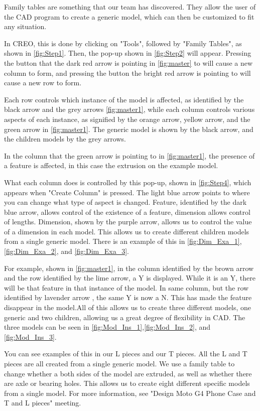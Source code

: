 \par Family tables are something that our team has discovered. They allow the user of the CAD program to create a generic model, which can then be customized to fit any situation. 
\par In CREO, this is done by clicking on "Tools", followed by "Family Tables", as shown in \ref{fig:Step1}. Then, the pop-up shown in \ref{fig:Step2} will appear. Pressing the button that the dark red arrow is pointing in \ref{fig:master} to will cause a new column to form, and pressing the button the bright red arrow is pointing to will cause a new row to form. 
\par Each row controls which instance of the model is affected, as identified by the black arrow and the grey arrows \ref{fig:master1}, while each column controls various aspects of each instance, as signified by the orange arrow, yellow arrow, and the green arrow in \ref{fig:master1}. The generic model is shown by the black arrow, and the children models by the grey arrows. 
\par In the column that the green arrow is pointing to in \ref{fig:master1}, the presence of a feature is affected, in this case the extrusion on the example model. 
\par What each column does is controlled by this pop-up, shown in \ref{fig:Step4}, which appears when "Create Column" is pressed. The light blue arrow points to where you can change what type of aspect is changed. Feature, identified by the dark blue arrow, allows control of the existence of a feature, dimension allows control of lengths. Dimension, shown by the purple arrow, allows us to control the value of a dimension in each model. This allows us to create different children models from a single generic model. There is an example of this in \ref{fig:Dim_Exa_1}, \ref{fig:Dim_Exa_2}, and \ref{fig:Dim_Exa_3}. 
\par For example, shown in \ref{fig:master1}, in the column identified by the brown arrow and the row identified by the lime arrow, a Y is displayed. While it is an Y, there will be that feature in that instance of the model. In same column, but the row identified by lavender arrow , the same Y is now a N. This has made the feature disappear in the model.All of this allows us to create three different models, one generic and two children, allowing us a great degree of flexibility in CAD. The three models can be seen in \ref{fig:Mod_Ins_1},\ref{fig:Mod_Ins_2}, and \ref{fig:Mod_Ins_3}.
\par You can see examples of this in our L pieces and our T pieces. All the L and T pieces are all created from a single generic model. We use a family table to change whether a both sides of the model are extruded, as well as whether there are axle or bearing holes. This allows us to create eight different specific models from a single model. For more information, see "Design Moto G4 Phone Case and T and L pieces" meeting. 

